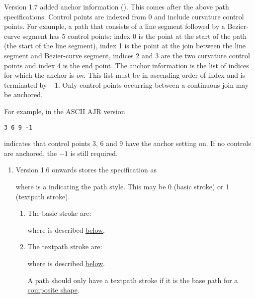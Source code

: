 \begin{numbered}
Version 1.7 added anchor information (). This comes
after the above path specifications. Control points are
indexed from 0 and include curvature control points. For example, a
path that consists of a line segment followed by a \gls{Bezier-curve} segment
has 5 control points: index 0 is the point at the start of the path
(the start of the line segment), index 1 is the point at the join
between the line segment and \gls{Bezier-curve} segment, indices 2 and 3 are
the two curvature control points and index 4 is the end point. The
anchor information is the list of  indices for which the anchor is
\emph{on}. This list must be in ascending order of index and is
terminated by $-1$. Only control points occurring between a
continuous join may be anchored.

For example, in the ASCII \gls{AJR} version
\begin{verbatim}
3 6 9 -1
\end{verbatim}
indicates that control points 3, 6 and 9 have the anchor setting on.
If no controls are anchored, the $-1$ is still required.

  \begin{enumerate}
  \item\label{jdr:pathstyle} Version 1.6 onwards stores the 
  specification as
  \begin{syntaxline}
   
  \end{syntaxline}
  where  is a 
  indicating the path style. This may be 0 (basic stroke) or 1
  (\gls{textpath} stroke).

    \begin{enumerate}
    \item The basic stroke  are:
    \begin{syntaxline}
      
    \end{syntaxline}
    where  is described \hyperref[jdr:linestyle]{below}.

    \item The \gls*{textpath} stroke  are:
    \begin{syntaxline}
     
    \end{syntaxline}
    where  is described
    \hyperref[jdr:textpathstroke]{below}.

    A path should only have a \gls*{textpath} stroke if it is the
    base path for a \hyperref[jdr:composite]{composite shape}.
    \end{enumerate}


\end{enumerate}
\end{numbered}
